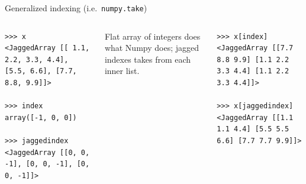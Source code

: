 \documentclass[aspectratio=169]{beamer}
\begin{document}
\begin{frame}[fragile]{Generalized indexing (i.e.\ \texttt{numpy.take})}
\small
\begin{columns}
\begin{verbatim}
>>> x
<JaggedArray [[ 1.1, 2.2, 3.3, 4.4], [5.5, 6.6], [7.7, 8.8, 9.9]]>

>>> index
array([-1, 0, 0])

>>> jaggedindex
<JaggedArray [[0, 0, -1], [0, 0, -1], [0, 0, -1]]>
\end{verbatim}

\vspace{0.5 cm}
\normalsize
Flat array of integers does what Numpy does; jagged indexes takes from each inner list.

\small
\begin{verbatim}
>>> x[index]
<JaggedArray [[7.7 8.8 9.9] [1.1 2.2 3.3 4.4] [1.1 2.2 3.3 4.4]]>

>>> x[jaggedindex]
<JaggedArray [[1.1 1.1 4.4] [5.5 5.5 6.6] [7.7 7.7 9.9]]>
\end{verbatim}
\end{columns}
\end{frame}
\end{document}
